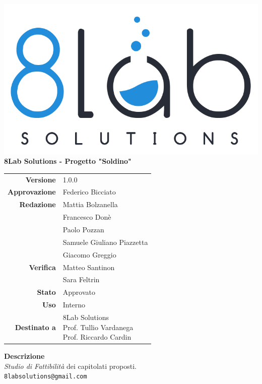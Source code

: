 \thispagestyle{empty}
\begin{titlepage}
	\begin{center}
		\includegraphics[scale = 0.3]{res/images/logo8_crop.png}\\
		\large \textbf{8Lab Solutions - Progetto "Soldino"} \\
		\vfill
		\Huge \textbf{\doctitle}
		\vspace*{\fill}
        
        \vfill
        \large
        \begin{tabular}{r|l}
                        \textbf{Versione} & 1.0.0 \\
                        \textbf{Approvazione} & Federico Bicciato \\
                        \textbf{Redazione} &  Mattia Bolzanella \\ &
                        	Francesco Donè\\&
                        	Paolo Pozzan\\&
                        	Samuele Giuliano Piazzetta\\&
                        	Giacomo Greggio\\
                        \textbf{Verifica} & Matteo Santinon \\&
                        	Sara Feltrin \\
                        \textbf{Stato} & Approvato \\
                        \textbf{Uso} & Interno \\
                        \textbf{Destinato a} & \parbox[t]{5cm}{8Lab Solutions
                        \\Prof. Tullio Vardanega\\Prof. Riccardo Cardin}
                \end{tabular}
                \vfill
                \normalsize
                \textbf{Descrizione}\\
                \textit{Studio di Fattibilità} dei capitolati proposti.\\
                \vfill
                \small
                \texttt{8labsolutions@gmail.com}
	\end{center}
\end{titlepage}